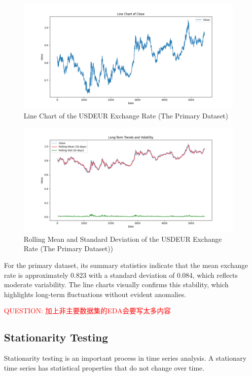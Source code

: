 \begin{figure}[H]
\centering
\includegraphics[width=\textwidth]{figures/line_chart}
\caption{Line Chart of the USDEUR Exchange Rate (The Primary Dataset)}
\label{fig:line_chart}
\end{figure}

\begin{figure}[H]
\centering
\includegraphics[width=\textwidth]{figures/rolling_statistics}
\caption{Rolling Mean and Standard Deviation of the USDEUR Exchange Rate (The Primary Dataset))}
\label{fig:rolling_statistics}
\end{figure}

For the primary dataset, its summary statistics indicate that the mean exchange rate is approximately 0.823 with a standard deviation of 0.084, which reflects moderate variability. The line charts visually confirms this stability, which highlights long-term fluctuations without evident anomalies.

\textcolor{red}{QUESTION: 加上非主要数据集的EDA会要写太多内容}

\subsection{Stationarity Testing}
Stationarity testing is an important process in time series analysis. A stationary time series has statistical properties that do not change over time.

